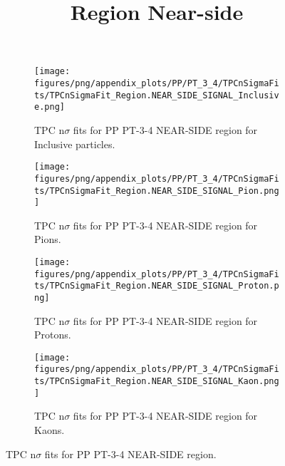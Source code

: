             \begin{figure}[H]
                \title{Region Near-side}
                \begin{subfigure}[b]{0.5\textwidth}
                    \centering
                    \texttt{[image: figures/png/appendix\_plots/PP/PT\_3\_4/TPCnSigmaFits/TPCnSigmaFit\_Region.NEAR\_SIDE\_SIGNAL\_Inclusive.png]}
                    \caption{TPC n$\sigma$ fits for PP PT-3-4 NEAR-SIDE region for Inclusive particles.}
                    \label{fig:appendix_PP_PT-3-4_NEAR_SIDE_SIGNAL_Inclusive}
                \end{subfigure}
                \begin{subfigure}[b]{0.5\textwidth}
                    \centering
                    \texttt{[image: figures/png/appendix\_plots/PP/PT\_3\_4/TPCnSigmaFits/TPCnSigmaFit\_Region.NEAR\_SIDE\_SIGNAL\_Pion.png]}
                    \caption{TPC n$\sigma$ fits for PP PT-3-4 NEAR-SIDE region for Pions.}
                    \label{fig:appendix_PP_PT-3-4_NEAR_SIDE_SIGNAL_Pion}
                \end{subfigure}
                \begin{subfigure}[b]{0.5\textwidth}
                    \centering
                    \texttt{[image: figures/png/appendix\_plots/PP/PT\_3\_4/TPCnSigmaFits/TPCnSigmaFit\_Region.NEAR\_SIDE\_SIGNAL\_Proton.png]}
                    \caption{TPC n$\sigma$ fits for PP PT-3-4 NEAR-SIDE region for Protons.}
                    \label{fig:appendix_PP_PT-3-4_NEAR_SIDE_SIGNAL_Proton}
                \end{subfigure}
                \begin{subfigure}[b]{0.5\textwidth}
                    \centering
                    \texttt{[image: figures/png/appendix\_plots/PP/PT\_3\_4/TPCnSigmaFits/TPCnSigmaFit\_Region.NEAR\_SIDE\_SIGNAL\_Kaon.png]}
                    \caption{TPC n$\sigma$ fits for PP PT-3-4 NEAR-SIDE region for Kaons.}
                    \label{fig:appendix_PP_PT-3-4_NEAR_SIDE_SIGNAL_Kaon}
                \end{subfigure}
                \caption{TPC n$\sigma$ fits for PP PT-3-4 NEAR-SIDE region.}
                \label{fig:appendix_PP_PT-3-4_NEAR_SIDE_SIGNAL}
            \end{figure}
